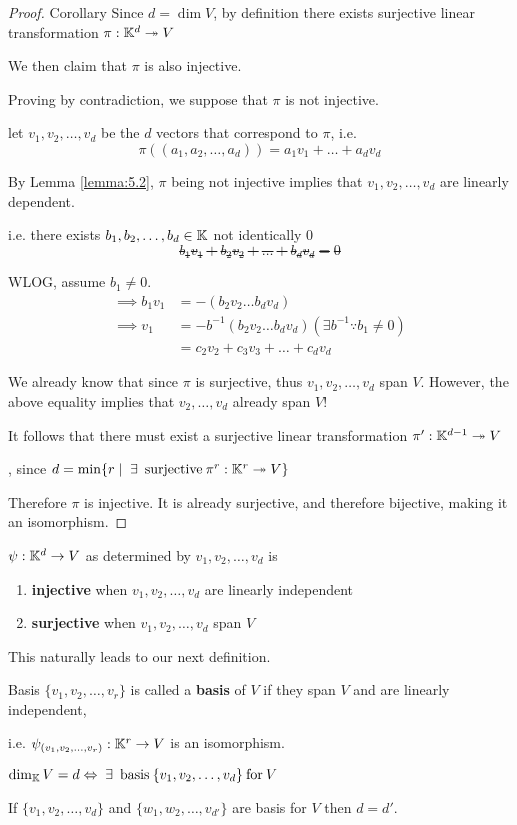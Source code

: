 \begin{proof}{Corollary}
    Since \(d = \dim V\), by definition there exists surjective linear transformation \(\pi: \mathbb{K}^d \twoheadrightarrow V\)

    We then claim that \(\pi\) is also injective.

    Proving by contradiction, we suppose that \(\pi\) is not injective.
    
    let \(v_1, v_2, \dots, v_d\) be the \(d\) vectors that correspond to \(\pi\), i.e. \[
    \pi((a_1, a_2, \dots, a_d)) = a_1v_1 + \dots + a_dv_d
    \]

    By Lemma \ref{lemma:5.2}, \(\pi\) being not injective implies that \(v_1, v_2, \dots, v_d\) are linearly dependent.

    i.e. there exists \(b_1, b_2, \dots, b_d \in \mathbb{K}\) not identically 0 \st \[
    b_1v_1 + b_2v_2 + \dots + b_dv_d = 0
    \]

    WLOG, assume \(b_1 \neq 0\).
    \begin{align*}
        \implies b_1v_1 &= -(b_2v_2 \dots b_dv_d) \\
        \implies v_1 &= -b^{-1}(b_2v_2 \dots b_dv_d) (\exists b^{-1} \because b_1 \neq 0) \\
        &= c_2v_2 + c_3v_3 + \dots + c_dv_d
    \end{align*}

    We already know that since \(\pi\) is surjective, thus \(v_1, v_2, \dots, v_d\) span \(V\). However, the above equality implies that \(v_2, \dots, v_d\) already span \(V\)!
    
    It follows that there must exist a surjective linear transformation \(\pi': \mathbb{K}^{d-1} \twoheadrightarrow V\)

    \contra, since \(d = \min\{r \mid \exists \:\text{surjective}\: \pi^r: \bbk^r \twoheadrightarrow V\}\)

    Therefore \(\pi\) is injective. It is already surjective, and therefore bijective, making it an isomorphism.
\end{proof}

\begin{recall}
    \(\psi: \mathbb{K}^d \to V\) as determined by \(v_1, v_2, \dots, v_d\) is 
    \begin{enumerate}
        \item \textbf{injective} when \(v_1, v_2, \dots, v_d\) are linearly independent
        \item \textbf{surjective} when \(v_1, v_2, \dots, v_d\) span \(V\)
    \end{enumerate}

    This naturally leads to our next definition.
\end{recall}
\begin{definition} {Basis}
    \(\{v_1, v_2, \dots, v_r\}\) is called a \textbf{basis} of \(V\) if they span \(V\) and are linearly independent,
    
    i.e. \(\psi_{(v_1, v_2, \dots, v_r)}: \mathbb{K}^r \to V\) is an isomorphism.
\end{definition}

\begin{corollary}
    \(
    \dim_\bbk V = d \Leftrightarrow \exists \:\text{basis}\: \{v_1, v_2, \dots, v_d\} \:\text{for}\: V
    \)
\end{corollary}
\begin{corollary}
    If \(\{v_1, v_2, \dots, v_d\}\) and \(\{w_1, w_2, \dots, v_{d'}\}\) are basis for \(V\) then \(d = d'\).
\end{corollary}